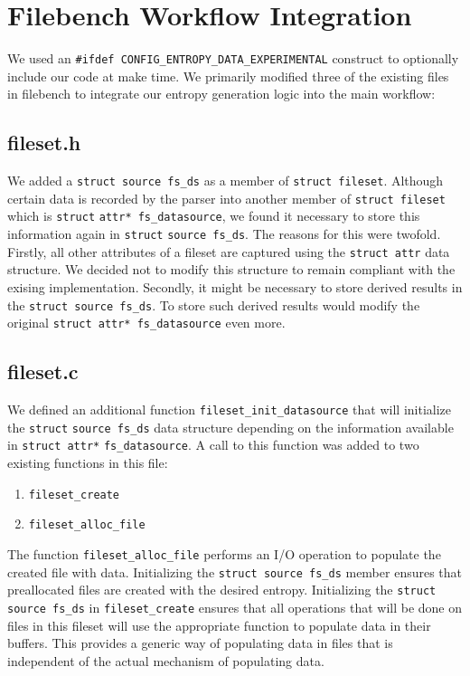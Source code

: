 \section{Filebench Workflow Integration}
We used an \verb+#ifdef CONFIG_ENTROPY_DATA_EXPERIMENTAL+ construct to optionally include our code at make time. We primarily modified three of the existing files in filebench to integrate our entropy generation logic into the main workflow:
\subsection{fileset.h}
We added a \verb+struct source fs_ds+ as a member of \verb+struct fileset+. Although certain data is recorded by the parser into another member of \verb+struct fileset+ which is \verb+struct+ \verb+attr* fs_datasource+, we found it necessary to store this information again in \verb+struct+ \verb+source fs_ds+. The reasons for this were twofold. Firstly, all other attributes of a fileset are captured using the \verb+struct attr+ data structure. We decided not to modify this structure to remain compliant with the exising implementation. Secondly, it might be necessary to store derived results in the \verb+struct source fs_ds+. To store such derived results would modify the original \verb+struct attr* fs_datasource+ even more.

\subsection{fileset.c}
We defined an additional function \verb+fileset_init_datasource+ that will initialize the \verb+struct+ \verb+source fs_ds+ data structure depending on the information available in \verb+struct attr*+ \verb+fs_datasource+. A call to this function was added to two existing functions in this file:
\begin{enumerate}
\item \verb+fileset_create+
\item \verb+fileset_alloc_file+
\end{enumerate}
The function \verb+fileset_alloc_file+ performs an I/O operation to populate the created file with data. Initializing the \verb+struct source fs_ds+ member ensures that preallocated files are created with the desired entropy. Initializing the \verb+struct source fs_ds+ in \verb+fileset_create+ ensures that all operations that will be done on files in this fileset will use the appropriate function to populate data in their buffers. This provides a generic way of populating data in files that is independent of the actual mechanism of populating data.

